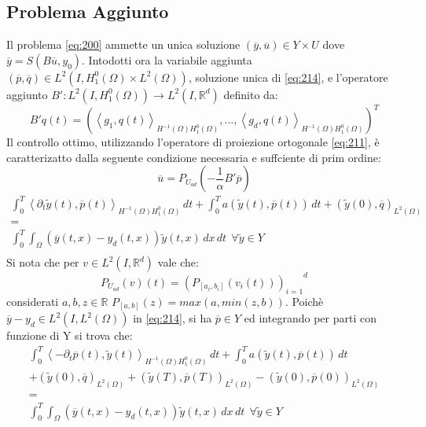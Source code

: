 \subsection{Problema Aggiunto}
Il problema \ref{eq:200} ammette un unica soluzione $(\overline{y},\overline{u}){\in}Y{\times}U$ dove $\overline{y}=S(B\overline{u},y_0)$.
Intodotti ora la variabile aggiunta $(\overline{p},\overline{q}) \in L^2(I,{H^{0}_{1}(\Omega)}{\times}{L^{2}(\Omega)})$, soluzione unica di \ref{eq:214}, e l'operatore aggiunto $B':L^2(I,{H^{0}_{1}(\Omega)}){\rightarrow}L^2(I,\mathbb{R}^d)$ definito da:
\begin{equation}
B'q(t) = ( \left \langle g_1,q(t) \right \rangle_{{H^{-1}(\Omega)}{H^{0}_{1}(\Omega)}}, . . . ,\left \langle g_d,q(t) \right \rangle_{{H^{-1}(\Omega)}{H^{0}_{1}(\Omega)}})^T
\label{eq:212}
\end{equation}
Il controllo ottimo, utilizzando l'operatore di proiezione ortogonale \ref{eq:211}, è caratterizatto dalla seguente condizione necessaria e suffciente di prim ordine:
\begin{equation}
\overline{u}=P_{U_{ad}}\left( -\frac{1}{\alpha}B'\overline{p} \right)
\label{eq:213}
\end{equation}
\begin{equation}
\begin{array}{c}
	\int_{0}^{T} \left \langle {\partial_{t}}\tilde{y}(t),\overline{p}(t) \right \rangle_{{H^{-1}(\Omega)}{H^{0}_{1}(\Omega)}} \, dt +  	\int_{0}^{T} a(\tilde{y}(t),\overline{p}(t)) \, dt + (\tilde{y}(0),\overline{q})_{L^{2}(\Omega)}  \\
	 = \\
	\int_{0}^{T} \int_{\Omega} (\overline{y}(t,x)-y_d(t,x))\tilde{y}(t,x) \,dx \, dt  \ \ \forall \tilde{y} \in Y \\
\end{array}
\label{eq:214}
\end{equation}
Si nota che per $v \in L^2(I,\mathbb{R}^d)$ vale che:
\begin{equation}
P_{U_{ad}}(v)(t) = {(P_{[a_i,b_i]}(v_i(t)))_{i=1}}^d
\label{eq:215}
\end{equation}
considerati $a,b,z \in \mathbb{R}$ $P_{[a,b]}(z) = max(a,min(z,b))$.
Poichè $\overline{y} - y_d \in L^2(I,{L^{2}(\Omega)})$ in \ref{eq:214}, si ha $\overline{p} \in Y$ ed integrando per parti con funzione di Y si trova che:
{\renewcommand\arraystretch{2}
\begin{equation}
\begin{array}{c}
	\int_{0}^{T} \left \langle -{\partial_{t}}\overline{p}(t),\tilde{y}(t) \right \rangle_{{H^{-1}(\Omega)}{H^{0}_{1}(\Omega)}} \, dt +  	\int_{0}^{T} a(\tilde{y}(t),\overline{p}(t)) \, dt \\
	+ (\tilde{y}(0),\overline{q})_{L^{2}(\Omega)} + (\tilde{y}(T),\overline{p}(T))_{L^{2}(\Omega)} - (\tilde{y}(0),\overline{p}(0))_{L^{2}(\Omega)} \\
	 = \\
	\int_{0}^{T} \int_{\Omega} (\overline{y}(t,x)-y_d(t,x))\tilde{y}(t,x) \,dx \, dt  \ \ \forall \tilde{y} \in Y \\
\end{array}
\label{eq:216}
\end{equation}
} %
